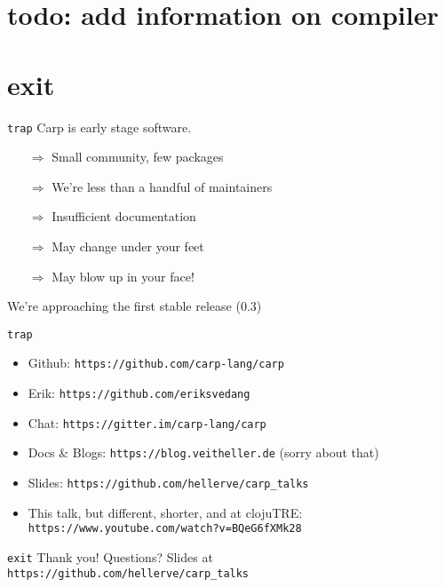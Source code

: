 \documentclass[aspectratio=169]{beamer}
\begin{document}
  \section{todo: add information on compiler}
  \section{exit}
  \begin{frame}{\texttt{trap}}
    Carp is early stage software.
    \begin{itemize}
      \item[$\Rightarrow$] Small community, few packages
      \item[$\Rightarrow$] We’re less than a handful of maintainers
      \item[$\Rightarrow$] Insufficient documentation
      \item[$\Rightarrow$] May change under your feet
      \item[$\Rightarrow$] May blow up in your face!
    \end{itemize}
    We’re approaching the first stable release (0.3)
  \end{frame}
  \begin{frame}{\texttt{trap}}
    \begin{itemize}
      \item Github: \texttt{https://github.com/carp-lang/carp}
      \item Erik: \texttt{https://github.com/eriksvedang}
      \item Chat: \texttt{https://gitter.im/carp-lang/carp}
      \item Docs \& Blogs: \texttt{https://blog.veitheller.de} (sorry about that)
      \item Slides: \texttt{https://github.com/hellerve/carp\_talks}
      \item This talk, but different, shorter, and at clojuTRE: \texttt{https://www.youtube.com/watch?v=BQeG6fXMk28}
    \end{itemize}
  \end{frame}
  \begin{frame}{\texttt{exit}}
    \Huge Thank you!
    \linebreak
    \linebreak
    \linebreak
    \small Questions?
    \linebreak
    \linebreak
    \tiny Slides at \texttt{https://github.com/hellerve/carp\_talks}
  \end{frame}
\end{document}
